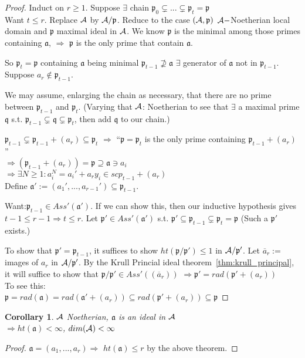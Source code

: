 \documentclass[11pt]{article}
\newtheorem{cor}[thm]{Corollary}
\newcommand{\sca}{{\mathfrak a}}
\newcommand{\scp}{{\mathfrak p}}
\newcommand{\scq}{\mathfrak q}
\newcommand{\cala}{{\cal A}}
\newcommand{\Lrta}{\Longrightarrow}
\begin{document}
\begin{proof}
Induct on $r\geq 1$. Suppose $\exists $ chain $\scp_0\subsetneq...\subsetneq\scp_t=\scp$\\
Want $t\leq r$. Replace $\cala$ by $\cala/\scp$. Reduce to the case $(\cala,\scp)$ $\cala-$Noetherian local domain and $\scp$ maximal ideal in $\cala$. We know $\scp$ is the minimal among those primes containing $\sca$, $\Lrta$ $\scp$ is the only prime that contain $\sca$.

So $\scp_t=\scp$ containing $\sca$ being minimal $\scp_{t-1}\nsupseteq\sca$ $\exists $ generator of $\sca$ not in $\scp_{t-1}$. Suppose $a_r\notin\scp_{t-1}$.

We may assume, enlarging the chain as necessary, that there are no prime between $\scp_{t-1}$ and $\scp_t$. (Varying that $\cala$: Noetherian to see that $\exists$ a maximal prime $\scq$ s.t. $\scp_{t-1}\subsetneq \scq\subsetneq \scp_t$, then add $\scq$ to our chain.)

$\scp_{t-1}\subsetneq \scp_{t-1}+(a_r)\subseteq\scp_t$ $\Lrta$ ``$\scp=\scp_t$ is the only prime containing $\scp_{t-1}+(a_r)$''\\
$\Lrta(\scp_{t-1}+(a_r))=\scp\supseteq \sca\ni a_i$\\
$\Lrta\exists N\geq 1: a_i^N=a_i'+a_r y_i\in scp_{t-1}+(a_r)$\\
Define $\sca':=(a_1',...,a_{r-1}')\subseteq \scp_{t-1}$.

Want:$\scp_{t-1}\in Ass'(\sca')$. If we can show this, then our inductive hypothesis gives $t-1\leq r-1\Lrta t\leq r$. Let $\scp'\in Ass'(\sca')$ s.t. $\scp'\subseteq \scp_{t-1}\subsetneq \scp_t=\scp$ (Such a $\scp'$ exists.)

To show that $\scp'=\scp_{t-1}$, it suffices to show $ht(\scp/\scp')\leq 1$ in $\cala/\scp'$. Let $\overline{a}_r:=$ images of $a_r$ in $\cala/\scp'$.
By the Krull Princial ideal theorem~\ref{thm:krull_principal}, it will suffice to show that 
$\scp/\scp'\in Ass'((\overline{a}_r))$ $\Lrta \scp'=rad(\scp'+(a_r))$\\
To see this:\\
$\scp=rad(\sca)=rad(\sca'+(a_r))\subseteq rad(\scp'+(a_r))\subseteq \scp$
\end{proof}
\begin{cor}
$\cala$ Noetherian, $\sca$ is an ideal in $\cala$\\
$\Lrta ht(\sca)<\infty$, $dim(\cala)<\infty$
\end{cor}
\begin{proof}
$\sca=(a_1,...,a_r)\Lrta$ $ht(\sca)\leq r$ by the above theorem.
\end{proof}
\end{document}
